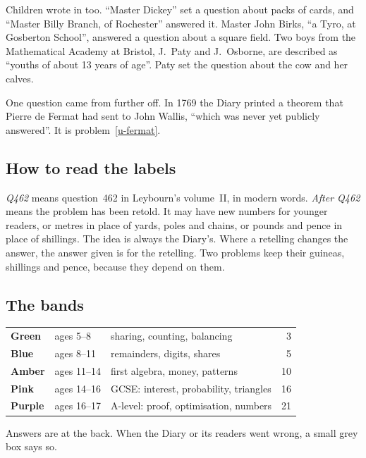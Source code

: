 \documentclass[11pt,a4paper]{article}
\newcounter{prob}
\begin{document}
Children wrote in too. ``Master Dickey'' set a question about packs of cards, and
``Master Billy Branch, of Rochester'' answered it. Master John Birks, ``a Tyro, at
Gosberton School'', answered a question about a square field. Two boys from the
Mathematical Academy at Bristol, J.~Paty and J.~Osborne, are described as ``youths of
about 13 years of age''. Paty set the question about the cow and her calves.

One question came from further off. In 1769 the Diary printed a theorem that Pierre de
Fermat had sent to John Wallis, ``which was never yet publicly answered''. It is
problem~\ref{u-fermat}.

\subsection*{How to read the labels}

\textit{Q462} means question~462 in Leybourn's volume~II, in modern words. \textit{After
Q462} means the problem has been retold. It may have new numbers for younger readers,
or metres in place of yards, poles and chains, or pounds and pence in place of
shillings. The idea is always the Diary's. Where a retelling changes the answer, the
answer given is for the retelling. Two problems keep their guineas, shillings and
pence, because they depend on them.

\subsection*{The bands}

\begin{center}
\begin{tabular}{>{\bfseries}l l l r}
\color{bandgreen}Green  & ages 5--8   & sharing, counting, balancing          & 3\\
\color{bandblue}Blue    & ages 8--11  & remainders, digits, shares            & 5\\
\color{bandamber}Amber  & ages 11--14 & first algebra, money, patterns        & 10\\
\color{bandpink}Pink    & ages 14--16 & GCSE: interest, probability, triangles & 16\\
\color{bandpurple}Purple & ages 16--17 & A-level: proof, optimisation, numbers & 21\\
\end{tabular}
\end{center}

Answers are at the back. When the Diary or its readers went wrong, a small grey box
says so.
\end{document}
